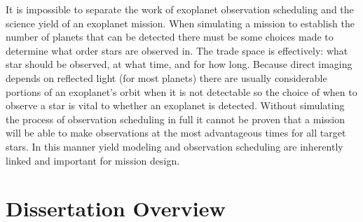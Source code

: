 It is impossible to separate the work of exoplanet observation scheduling and
the science yield of an exoplanet mission. When simulating a mission to
establish the number of planets that can be detected there must be some choices
made to determine what order stars are observed in. The trade space is
effectively: what star should be observed, at what time, and for how long. Because
direct imaging depends on reflected light (for most planets) there are usually
considerable portions of an exoplanet's orbit when it is not detectable so the
choice of when to observe a star is vital to whether an exoplanet is detected.
Without simulating the process of observation scheduling in full it cannot be
proven that a mission will be able to make observations at the most
advantageous times for all target stars. In this manner yield modeling and
observation scheduling are inherently linked and important for mission design.


\section{Dissertation Overview}
\label{sec:dis_overview}


